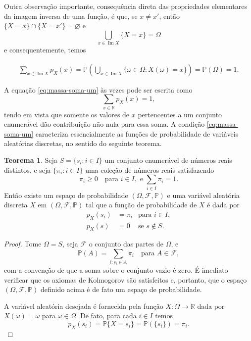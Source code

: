 \documentclass[12pt,portuguese]{article}
\let\geq\geqslant
\theoremstyle{definition}
\newtheorem{theorem}{Teorema}
\begin{document}
Outra observação importante, consequência direta das propriedades elementares da
imagem inversa de uma função, é que, se $x\neq x'$, então
$\{X=x\}\cap \{X=x'\}=\varnothing$
e
\[
\bigcup_{x\in \operatorname{Im} X} \{X=x\} =\Omega
\]
e consequentemente, temos

\begin{align}
  \sum_{x \in \operatorname{Im} X} p_X(x)
  = \mathbb{P}\left( \bigcup_{x \in \operatorname{Im} X}
    \{\omega \in \Omega : X(\omega) = x\} \right)
  = \mathbb{P}(\Omega) = 1. \label{eq:massa-soma-um}
\end{align}

A equação \eqref{eq:massa-soma-um} às vezes pode ser escrita como
\[
  \sum_{x \in \mathbb{R}} p_X(x) = 1,
\]
tendo em vista que somente os valores de \(x\) pertencentes a um conjunto
enumerável dão contribuição não nula para essa soma. A condição
\eqref{eq:massa-soma-um} caracteriza essencialmente as funções de
probabilidade de variáveis aleatórias discretas, no
sentido do seguinte teorema.

\begin{theorem}\label{thm:caracterizacao-funcao-de-massa}
  Seja \(S = \{s_i : i \in I\}\) um conjunto enumerável de números reais
  distintos, e seja \(\{\pi_i : i \in I\}\) uma coleção de números reais
  satisfazendo
  \[
    \pi_i \geq 0 \quad \text{para } i \in I, \text{ e } \sum_{i \in I}
    \pi_i = 1.
  \]
  Então existe um espaço de probabilidade \((\Omega, \mathcal{F}, \mathbb{P})\) e
  uma variável aleatória discreta \(X\) em \((\Omega, \mathcal{F},
  \mathbb{P})\) tal que a função de probabilidade de \(X\) é dada
  por
  \[
    \begin{aligned}
      p_X(s_i) &= \pi_i & \text{para } i \in I, \\
      p_X(s) &= 0 & \text{se } s \notin S.
    \end{aligned}
  \]
\end{theorem}

\begin{proof}
  Tome \(\Omega = S\), seja \(\mathcal{F}\) o conjunto das partes de
  \(\Omega\), e
  \[
    \mathbb{P}(A) = \sum_{i : s_i \in A} \pi_i \quad \text{para } A \in
    \mathcal{F},
  \]
  com a convenção de que a soma sobre o conjunto vazio é zero. É imediato
  verificar que os axiomas de Kolmogorov são satisfeitos e, portanto, que o
  espaço \((\Omega,\mathcal{F},\mathbb{P})\) definido acima é de fato um
  espaço de probabilidade.

  A variável aleatória desejada é fornecida pela função
  \(X : \Omega \to \mathbb{R}\) dada por \(X(\omega) = \omega\)
  para \(\omega \in \Omega\). De fato, para cada $i \in I$ temos
  \[
  p_{X}(s_i) = \mathbb{P}\{X=s_i\}
  = \mathbb{P}(\{s_i\}) = \pi_i.
  \]
\end{proof}
\end{document}
